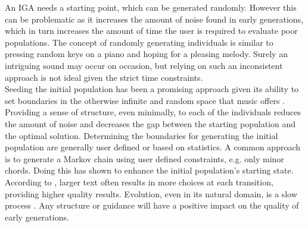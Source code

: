 \documentclass[12pt]{article} %
\begin{document}
An IGA needs a starting point, which can be generated randomly. However this can be problematic as it increases the amount of noise found in early generations, which in turn increases the amount of time the user is required to evaluate poor populations. The concept of randomly generating individuals is similar to pressing random keys on a piano and hoping for a pleasing melody. Surely an intriguing sound may occur on occasion, but relying on such an inconsistent approach is not ideal given the strict time constraints. \\

Seeding the initial population has been a promising approach given its ability to set boundaries in the otherwise infinite and random space that music offers \cite{Biles01}. Providing a sense of structure, even minimally, to each of the individuals reduces the amount of noise and decreases the gap between the starting population and the optimal solution. Determining the boundaries for generating the initial population are generally user defined or based on statistics. A common approach is to generate a Markov chain using user defined constraints, e.g. only minor chords. Doing this has shown to enhance the initial population's starting state. According to \cite{Shabda}, larger text often results in more choices at each transition, providing higher quality results. Evolution, even in its natural domain, is a slow process \cite{ToddWerner}. Any structure or guidance will have a positive impact on the quality of early generations.


\end{document}
